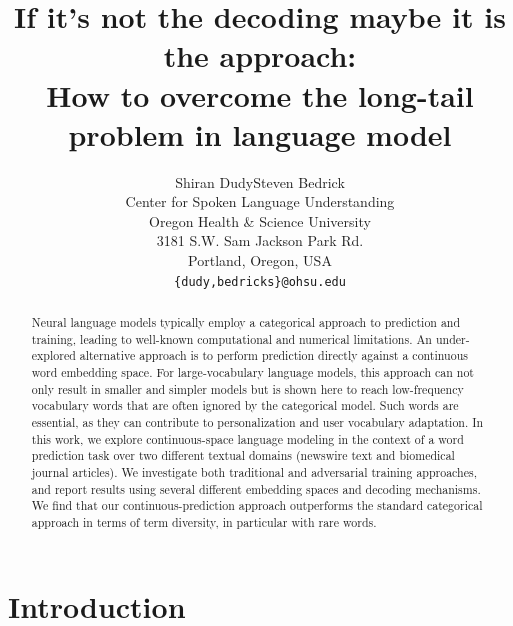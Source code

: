 \documentclass[11pt,a4paper]{article}
\title{If it's not the decoding maybe it is the approach:\\ How to overcome the long-tail problem in language model}
\author{Shiran Dudy\qquad Steven Bedrick\\
		Center for Spoken Language Understanding \\
	    Oregon Health \& Science University\\
	    3181 S.W. Sam Jackson Park Rd.\\
	    Portland, Oregon, USA\\
	    {\tt \{dudy,bedricks\}@ohsu.edu}}
\date{}
\begin{document}
\setlength{\abovedisplayskip}{0.5em}
\setlength{\belowdisplayskip}{0.5em}


\maketitle
\begin{abstract}
Neural language models typically employ a categorical approach to prediction and training, leading to well-known computational and numerical limitations. 
An under-explored alternative approach is to perform prediction directly against a continuous word embedding space. 
For large-vocabulary language models, this approach can not only result in smaller and simpler models but is shown here to reach low-frequency vocabulary words that are often ignored by the categorical model. Such words are essential, as they can contribute to personalization and user vocabulary adaptation.
In this work, we explore continuous-space language modeling in the context of a word prediction task over two different textual domains (newswire text and biomedical journal articles). 
We investigate both traditional and adversarial training approaches, and report results using several different embedding spaces and decoding mechanisms. 
We find that our continuous-prediction approach outperforms the standard categorical approach in terms of term diversity, in particular with rare words. 

\end{abstract}

\section{Introduction}\label{sec:intro}
\end{document}
